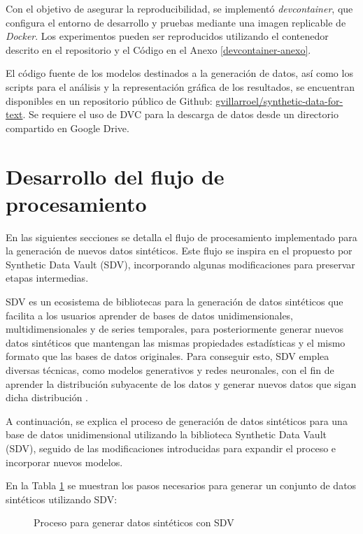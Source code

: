 Con el objetivo de asegurar la reproducibilidad, se implementó \textit{devcontainer}, que configura el entorno de desarrollo y pruebas mediante una imagen replicable de \textit{Docker}. Los experimentos pueden ser reproducidos utilizando el contenedor descrito en el repositorio y el Código en el Anexo \ref{devcontainer-anexo}.


El código fuente de los modelos destinados a la generación de datos, así como los scripts para el análisis y la representación gráfica de los resultados, se encuentran disponibles en un repositorio público de Github:
\href{https://github.com/gvillarroel/synthetic-data-for-text}{gvillarroel/synthetic-data-for-text}. Se requiere el uso de DVC para la descarga de datos desde un directorio compartido en Google Drive.

\newpage

\section{Desarrollo del flujo de procesamiento}
\label{subsec:procesamiento}
En las siguientes secciones se detalla el flujo de procesamiento implementado para la generación de nuevos datos sintéticos. Este flujo se inspira en el propuesto por Synthetic Data Vault (SDV), incorporando algunas modificaciones para preservar etapas intermedias.

SDV es un ecosistema de bibliotecas para la generación de datos sintéticos que facilita a los usuarios aprender de bases de datos unidimensionales, multidimensionales y de series temporales, para posteriormente generar nuevos datos sintéticos que mantengan las mismas propiedades estadísticas y el mismo formato que las bases de datos originales. Para conseguir esto, SDV emplea diversas técnicas, como modelos generativos y redes neuronales, con el fin de aprender la distribución subyacente de los datos y generar nuevos datos que sigan dicha distribución \cite{kotelnikov_overview_nodate, patki_synthetic_2016}.

A continuación, se explica el proceso de generación de datos sintéticos para una base de datos unidimensional utilizando la biblioteca Synthetic Data Vault (SDV), seguido de las modificaciones introducidas para expandir el proceso e incorporar nuevos modelos.

En la Tabla \ref{process-sdv} se muestran los pasos necesarios para generar un conjunto de datos sintéticos utilizando SDV:

\begin{figure}[H]
	\centering
	
	\caption{Proceso para generar datos sintéticos con SDV}
	\label{process-sdv}
\end{figure}

